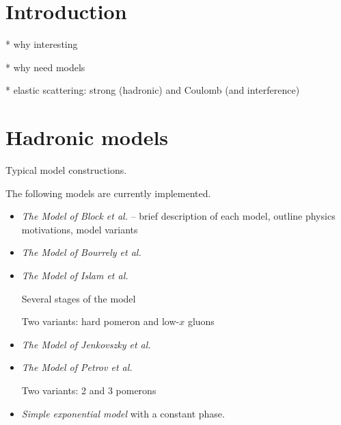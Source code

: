 \documentclass[preprint,12pt]{elsarticle}
\begin{document}
\newpage


\section{Introduction}\label{s:inc}

* why interesting

* why need models

* elastic scattering: strong (hadronic) and Coulomb (and interference)



\section{Hadronic models}\label{s:had mod}

Typical model constructions.

The following models are currently implemented.


\begin{itemize}

\item {\em The Model of Block et al.} \cite{bh99,bh11} -- brief description of each model, outline physics motivations, model variants

\item {\em The Model of Bourrely et al.} \cite{bsw79,bsw84,bsw03,bsw11} \cite{wu70}

\item {\em The Model of Islam et al.} \cite{islam84,islam87,islam03,islam05,islam06,islam09}

Several stages of the model

Two variants: hard pomeron and low-$x$ gluons

\item {\em The Model of Jenkovszky et al.} \cite{jenkovszky11}

\item {\em The Model of Petrov et al.} \cite{petrov02}

Two variants: 2 and 3 pomerons

\item {\em Simple exponential model} with a constant phase.

\end{itemize}
\end{document}
